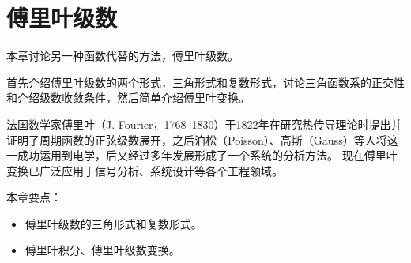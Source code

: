 \chapter{傅里叶级数}

本章讨论另一种函数代替的方法，傅里叶级数。

首先介绍傅里叶级数的两个形式，三角形式和复数形式，讨论三角函数系的正交性和介绍级数收敛条件，然后简单介绍傅里叶变换。

法国数学家傅里叶（J. Fourier，1768~1830）于1822年在研究热传导理论时提出并证明了周期函数的正弦级数展开，之后泊松（Poisson）、高斯（Gauss）等人将这一成功运用到电学，后又经过多年发展形成了一个系统的分析方法。
现在傅里叶变换已广泛应用于信号分析、系统设计等各个工程领域。

本章要点：
\begin{itemize}
    \item 傅里叶级数的三角形式和复数形式。
    \item 傅里叶积分、傅里叶级数变换。
\end{itemize}

~

\newpage


\newpage


\newpage


\newpage


\newpage


\newpage





